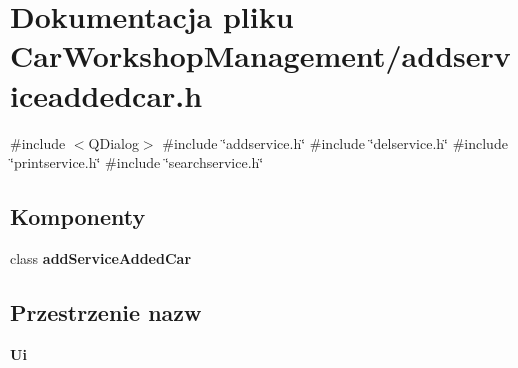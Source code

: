 \section{Dokumentacja pliku Car\+Workshop\+Management/addserviceaddedcar.h}
\label{addserviceaddedcar_8h}
{\ttfamily \#include $<$Q\+Dialog$>$}\newline
{\ttfamily \#include \char`\"{}addservice.\+h\char`\"{}}\newline
{\ttfamily \#include \char`\"{}delservice.\+h\char`\"{}}\newline
{\ttfamily \#include \char`\"{}printservice.\+h\char`\"{}}\newline
{\ttfamily \#include \char`\"{}searchservice.\+h\char`\"{}}\newline
\subsection*{Komponenty}
\begin{DoxyCompactItemize}
\item 
class \textbf{ add\+Service\+Added\+Car}
\end{DoxyCompactItemize}
\subsection*{Przestrzenie nazw}
\begin{DoxyCompactItemize}
\item 
 \textbf{ Ui}
\end{DoxyCompactItemize}
